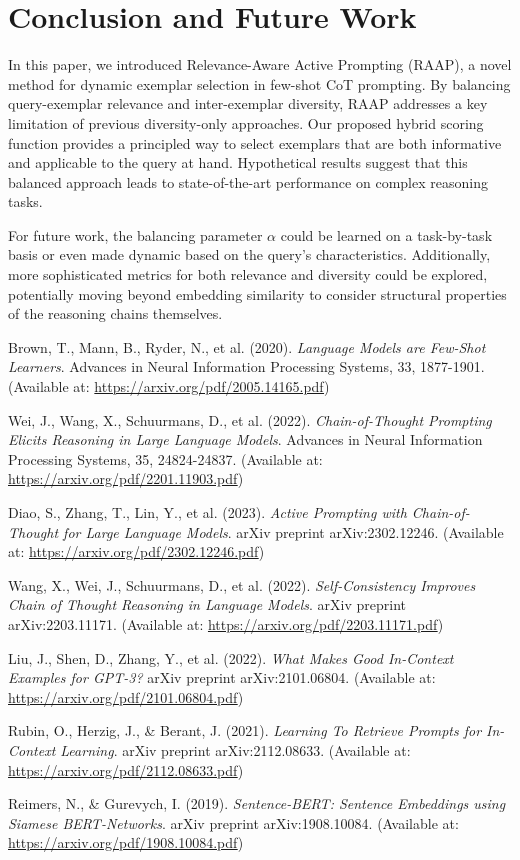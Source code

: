 \documentclass[10pt,twocolumn,letterpaper]{article}
\begin{document}
\section{Conclusion and Future Work}

In this paper, we introduced Relevance-Aware Active Prompting (RAAP), a novel method for dynamic exemplar selection in few-shot CoT prompting. By balancing query-exemplar relevance and inter-exemplar diversity, RAAP addresses a key limitation of previous diversity-only approaches. Our proposed hybrid scoring function provides a principled way to select exemplars that are both informative and applicable to the query at hand. Hypothetical results suggest that this balanced approach leads to state-of-the-art performance on complex reasoning tasks.

For future work, the balancing parameter $\alpha$ could be learned on a task-by-task basis or even made dynamic based on the query's characteristics. Additionally, more sophisticated metrics for both relevance and diversity could be explored, potentially moving beyond embedding similarity to consider structural properties of the reasoning chains themselves.

\begin{thebibliography}{9}

Brown, T., Mann, B., Ryder, N., et al. (2020).
\textit{Language Models are Few-Shot Learners}.
Advances in Neural Information Processing Systems, 33, 1877-1901.
(Available at: \url{https://arxiv.org/pdf/2005.14165.pdf})

Wei, J., Wang, X., Schuurmans, D., et al. (2022).
\textit{Chain-of-Thought Prompting Elicits Reasoning in Large Language Models}.
Advances in Neural Information Processing Systems, 35, 24824-24837.
(Available at: \url{https://arxiv.org/pdf/2201.11903.pdf})

Diao, S., Zhang, T., Lin, Y., et al. (2023).
\textit{Active Prompting with Chain-of-Thought for Large Language Models}.
arXiv preprint arXiv:2302.12246.
(Available at: \url{https://arxiv.org/pdf/2302.12246.pdf})

Wang, X., Wei, J., Schuurmans, D., et al. (2022).
\textit{Self-Consistency Improves Chain of Thought Reasoning in Language Models}.
arXiv preprint arXiv:2203.11171.
(Available at: \url{https://arxiv.org/pdf/2203.11171.pdf})

Liu, J., Shen, D., Zhang, Y., et al. (2022).
\textit{What Makes Good In-Context Examples for GPT-3?}
arXiv preprint arXiv:2101.06804.
(Available at: \url{https://arxiv.org/pdf/2101.06804.pdf})

Rubin, O., Herzig, J., \& Berant, J. (2021).
\textit{Learning To Retrieve Prompts for In-Context Learning}.
arXiv preprint arXiv:2112.08633.
(Available at: \url{https://arxiv.org/pdf/2112.08633.pdf})

Reimers, N., \& Gurevych, I. (2019).
\textit{Sentence-BERT: Sentence Embeddings using Siamese BERT-Networks}.
arXiv preprint arXiv:1908.10084.
(Available at: \url{https://arxiv.org/pdf/1908.10084.pdf})

\end{thebibliography}
\end{document}
